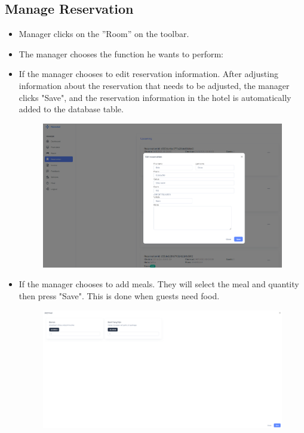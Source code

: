     \subsection{Manage Reservation}
    \begin{itemize}
        \item Manager clicks on the ”Room” on the toolbar.
        \item The manager chooses the function he wants to perform:
        \item If the manager chooses to edit reservation information. After adjusting information about the reservation that needs to be adjusted, the manager clicks "Save", and the reservation information in the hotel is automatically added to the database table.
        \begin{figure}[H]
            \includegraphics[width=1\linewidth]{img/editreservation.png}
            \label{fig:editreservation}
        \end{figure}
        \item If the manager chooses to add meals. They will select the meal and quantity then press "Save". This is done when guests need food.
        \begin{figure}[H]
            \includegraphics[width=1\linewidth]{img/Addmeal_reservation.png}
            \label{fig:addmeal_reservation}
        \end{figure}
    \end{itemize}
